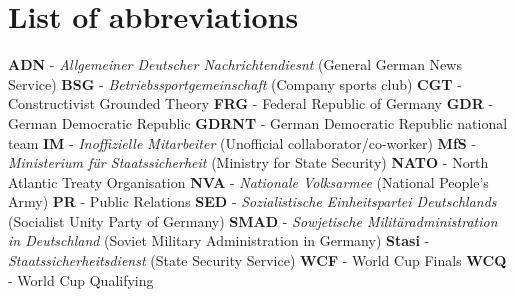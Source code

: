 

\chapter*{List of abbreviations}
\begin{footnotesize}
\noindent
\textbf{ADN} - \textit{Allgemeiner Deutscher Nachrichtendiesnt} (General German News Service)\newline
\textbf{BSG} - \textit{Betriebssportgemeinschaft} (Company sports club)\newline
\textbf{CGT} - Constructivist Grounded Theory\newline
\textbf{FRG} - Federal Republic of Germany\newline
\textbf{GDR} - German Democratic Republic\newline
\textbf{GDRNT} - German Democratic Republic national team\newline
\textbf{IM} - \textit{Inoffizielle Mitarbeiter} (Unofficial collaborator/co-worker)\newline
\textbf{MfS} - \textit{Ministerium für Staatssicherheit} (Ministry for State Security)\newline
\textbf{NATO} - North Atlantic Treaty Organisation\newline
\textbf{NVA} - \textit{Nationale Volksarmee} (National People's Army)\newline
\textbf{PR} - Public Relations\newline
\textbf{SED} - \textit{Sozialistische Einheitspartei Deutschlands} (Socialist Unity Party of Germany)\newline
\textbf{SMAD} - \textit{Sowjetische Militäradministration in Deutschland} (Soviet Military Administration in Germany)\newline
\textbf{Stasi} - \textit{Staatssicherheitsdienst} (State Security Service)\newline
\textbf{WCF} - World Cup Finals\newline
\textbf{WCQ} - World Cup Qualifying\newline
\end{footnotesize}
